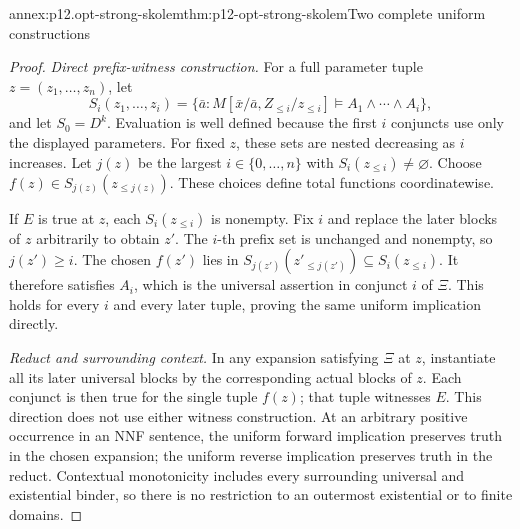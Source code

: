 \begin{annexitem}{annex:p12.opt-strong-skolem}{thm:p12-opt-strong-skolem}{Two complete uniform constructions}
\begin{proof}
\emph{Direct prefix-witness construction.}
For a full parameter tuple \(z=(z_1,\ldots,z_n)\), let
\[
 S_i(z_1,\ldots,z_i)=
 \{\bar a:M[\bar x/\bar a,Z_{\le i}/z_{\le i}]
                     \models A_1\land\cdots\land A_i\},
\]
and let \(S_0=D^k\). Evaluation is well defined because the first
\(i\) conjuncts use only the displayed parameters. For fixed \(z\),
these sets are nested decreasing as \(i\) increases.
Let \(j(z)\) be the largest \(i\in\{0,\ldots,n\}\) with
\(S_i(z_{\le i})\ne\varnothing\).
Choose \(f(z)\in S_{j(z)}(z_{\le j(z)})\).
These choices define total functions coordinatewise.

If \(E\) is true at \(z\), each \(S_i(z_{\le i})\) is nonempty.
Fix \(i\) and replace the later blocks of \(z\) arbitrarily to
obtain \(z'\). The \(i\)-th prefix set is unchanged and nonempty,
so \(j(z')\ge i\). The chosen \(f(z')\) lies in
\(S_{j(z')}(z'_{\le j(z')})\subseteq S_i(z_{\le i})\).
It therefore satisfies \(A_i\), which is the universal assertion
in conjunct \(i\) of \(\Xi\). This holds for every \(i\) and
every later tuple, proving the same uniform implication directly.

\emph{Reduct and surrounding context.}
In any expansion satisfying \(\Xi\) at \(z\), instantiate all its
later universal blocks by the corresponding actual blocks of \(z\).
Each conjunct is then true for the single tuple \(f(z)\);
that tuple witnesses \(E\). This direction does not use either
witness construction. At an arbitrary positive occurrence in an NNF
sentence, the uniform forward implication preserves truth in the
chosen expansion; the uniform reverse implication preserves truth
in the reduct. Contextual monotonicity includes every surrounding
universal and existential binder, so there is no restriction to
an outermost existential or to finite domains.
\end{proof}
\end{annexitem}

